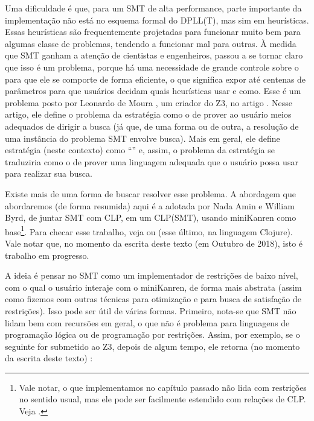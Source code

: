\documentclass{article}
\begin{document}
Uma dificuldade é que, para um  SMT de alta
performance, parte importante da implementação não está no esquema
formal do DPLL(T), mas sim em heurísticas. Essas heurísticas
são frequentemente projetadas para funcionar muito bem para algumas
classe de problemas, tendendo a funcionar mal para outras. À
medida que  SMT ganham a atenção de cientistas e
engenheiros, passou a se tornar claro que isso é um problema, porque há
uma necessidade de grande controle sobre o  para que
ele se comporte de forma eficiente, o que 
significa expor até centenas de parâmetros para que usuários
decidam quais heurísticas usar e como. Esse é um problema posto por
Leonardo de Moura , um criador do Z3, no artigo
\cite{moura}. Nesse artigo, ele define o problema da estratégia como o
de prover ao usuário meios adequados de dirigir a busca (já que, de
uma forma ou de outra, a resolução de uma instância do problema SMT
envolve busca). Mais em geral, ele define estratégia (neste contexto)
como ``''\cite{moura} e, assim, o problema da estratégia se
traduziria como o de prover uma linguagem adequada que o usuário possa
usar para realizar sua busca.

Existe mais de uma forma de buscar resolver esse problema. A abordagem
que abordaremos (de forma resumida) aqui é a adotada por Nada Amin e
William Byrd, de juntar SMT com CLP, em um CLP(SMT), usando miniKanren
como base\footnote{Vale notar, o que implementamos no capítulo passado
  não lida com restrições no sentido usual, mas ele pode ser
  facilmente estendido com relações de CLP. Veja \cite{alvis}.}. Para
checar esse trabalho, veja \cite{namin} ou
\cite{namim} (esse último, na linguagem Clojure). Vale notar que, no
momento da escrita deste texto (em Outubro de 2018), isto é trabalho
em progresso.

A ideia é pensar no  SMT como um implementador de
restrições de baixo nível, com o qual o usuário interaje com o
miniKanren, de forma mais abstrata (assim como fizemos com outras
técnicas para otimização e para busca de satisfação de
restrições). Isso pode ser útil de várias formas. Primeiro, nota-se
que  SMT não lidam bem com recursões em geral, o que
não é problema para linguagens de programação lógica ou de programação
por restrições. Assim, por exemplo, se o seguinte for submetido ao Z3,
depois de algum tempo, ele retorna (no momento da escrita deste texto)
:
\end{document}
